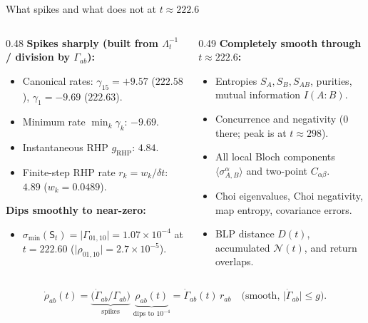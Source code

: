 \documentclass[aspectratio=169,11pt]{beamer}
\newcommand{\St}{\mathsf S_t}
\begin{document}
\begin{frame}{What spikes and what does not at $t \approx 222.6$}
\footnotesize
\begin{columns}[T,totalwidth=\textwidth]
\begin{column}{0.48\textwidth}
\textbf{Spikes sharply (built from $\Lambda_t^{-1}$ / division by $\Gamma_{ab}$):}
\begin{itemize}\setlength\itemsep{3pt}
\item Canonical rates: $\gamma_{15}=+9.57$ ($222.58$), $\gamma_1=-9.69$ ($222.63$).
\item Minimum rate $\min_k\gamma_k$: $-9.69$.
\item Instantaneous RHP $g_{\mathrm{RHP}}$: $4.84$.
\item Finite-step RHP rate $r_k=w_k/\delta t$: $4.89$ ($w_k=0.0489$).
\end{itemize}
\smallskip
\textbf{Dips smoothly to near-zero:}
\begin{itemize}\setlength\itemsep{2pt}
\item $\sigma_{\min}(\St)=\lvert\Gamma_{01,10}\rvert=1.07\times 10^{-4}$ at $t=222.60$ ($\lvert\rho_{01,10}\rvert=2.7\times 10^{-5}$).
\end{itemize}
\end{column}
\begin{column}{0.49\textwidth}
\textbf{Completely smooth through $t\approx 222.6$:}
\begin{itemize}\setlength\itemsep{3pt}
\item Entropies $S_A,S_B,S_{AB}$, purities, mutual information $I(A:B)$.
\item Concurrence and negativity ($0$ there; peak is at $t\approx 298$).
\item All local Bloch components $\langle\sigma_{A,B}^\alpha\rangle$ and two-point $C_{\alpha\beta}$.
\item Choi eigenvalues, Choi negativity, map entropy, covariance errors.
\item BLP distance $D(t)$, accumulated $\mathcal N(t)$, and return overlaps.
\end{itemize}
\end{column}
\end{columns}
\smallskip
\[
\dot\rho_{ab}(t)=\underbrace{\bigl(\dot\Gamma_{ab}/\Gamma_{ab}\bigr)}_{\text{spikes}}\;\underbrace{\rho_{ab}(t)}_{\text{dips to }10^{-4}}=\dot\Gamma_{ab}(t)\,r_{ab}\quad\bigl(\text{smooth, }\lvert\dot\Gamma_{ab}\rvert\le g\bigr).
\]
\end{frame}
\end{document}
